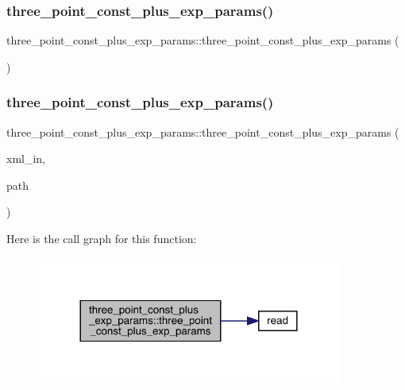 \subsubsection{\texorpdfstring{three\_point\_const\_plus\_exp\_params()}{three\_point\_const\_plus\_exp\_params()}\hspace{0.1cm}{\footnotesize\ttfamily [1/2]}}
{\footnotesize\ttfamily three\+\_\+point\+\_\+const\+\_\+plus\+\_\+exp\+\_\+params\+::three\+\_\+point\+\_\+const\+\_\+plus\+\_\+exp\+\_\+params (\begin{DoxyParamCaption}{ }\end{DoxyParamCaption})\hspace{0.3cm}{\ttfamily [inline]}}

\mbox{\label{structthree__point__const__plus__exp__params_a0d692445e74a2dc96a6c48983270da81}} 
\subsubsection{\texorpdfstring{three\_point\_const\_plus\_exp\_params()}{three\_point\_const\_plus\_exp\_params()}\hspace{0.1cm}{\footnotesize\ttfamily [2/2]}}
{\footnotesize\ttfamily three\+\_\+point\+\_\+const\+\_\+plus\+\_\+exp\+\_\+params\+::three\+\_\+point\+\_\+const\+\_\+plus\+\_\+exp\+\_\+params (\begin{DoxyParamCaption}\item[{X\+M\+L\+Reader \&}]{xml\+\_\+in,  }\item[{const string \&}]{path }\end{DoxyParamCaption})}

Here is the call graph for this function\+:
\nopagebreak
\begin{figure}[H]
\begin{center}
\leavevmode
\includegraphics[width=284pt]{de/db5/structthree__point__const__plus__exp__params_a0d692445e74a2dc96a6c48983270da81_cgraph}
\end{center}
\end{figure}


